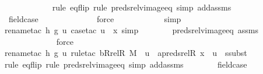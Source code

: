 \begin{isabellebody}
\ \ \ \ \ \ \ \ \ \ \ \isamarkupfalse%
{\isacharparenleft}{\kern0pt}rule\ eq{\isacharunderscore}{\kern0pt}flip{\isacharcomma}{\kern0pt}\ rule\ preds{\isacharunderscore}{\kern0pt}rel{\isacharunderscore}{\kern0pt}vimage{\isacharunderscore}{\kern0pt}eq{\isacharcomma}{\kern0pt}\ simp\ add{\isacharcolon}{\kern0pt}assms{\isacharparenright}{\kern0pt}\isanewline
\ \ \ \ \ \ \isamarkupfalse%
\ fieldcase\ \isanewline
\ \ \ \ \ \ \ \ \ \ \ \isamarkupfalse%
\ force\isanewline
\ \ \ \ \ \ \ \ \ \ \isamarkupfalse%
\ simp\isanewline
\ \ \ \ \ \ \ \ \ \ \isamarkupfalse%
{\isacharparenleft}{\kern0pt}rename{\isacharunderscore}{\kern0pt}tac\ h\ g\ u{\isacharcomma}{\kern0pt}\ case{\isacharunderscore}{\kern0pt}tac\ {\isachardoublequoteopen}u\ {\isacharequal}{\kern0pt}\ x{\isachardoublequoteclose}{\isacharcomma}{\kern0pt}\ simp{\isacharparenright}{\kern0pt}\isanewline
\ \ \ \ \ \ \isamarkupfalse%
\ preds{\isacharunderscore}{\kern0pt}rel{\isacharunderscore}{\kern0pt}vimage{\isacharunderscore}{\kern0pt}eq{\isacharprime}{\kern0pt}\ assms\ \isanewline
\ \ \ \ \ \ \ \ \ \ \ \isamarkupfalse%
\ force\isanewline
\ \ \ \ \ \ \ \ \ \isamarkupfalse%
{\isacharparenleft}{\kern0pt}rename{\isacharunderscore}{\kern0pt}tac\ h\ g\ u{\isacharcomma}{\kern0pt}\ rule{\isacharunderscore}{\kern0pt}tac\ b{\isacharequal}{\kern0pt}{\isachardoublequoteopen}Rrel{\isacharparenleft}{\kern0pt}R{\isacharcomma}{\kern0pt}\ M{\isacharparenright}{\kern0pt}\ {\isacharminus}{\kern0pt}{\isacharbackquote}{\kern0pt}{\isacharbackquote}{\kern0pt}\ {\isacharbraceleft}{\kern0pt}u{\isacharbraceright}{\kern0pt}{\isachardoublequoteclose}\ \ a{\isacharequal}{\kern0pt}{\isachardoublequoteopen}preds{\isacharunderscore}{\kern0pt}rel{\isacharparenleft}{\kern0pt}R{\isacharcomma}{\kern0pt}\ x{\isacharparenright}{\kern0pt}\ {\isacharminus}{\kern0pt}{\isacharbackquote}{\kern0pt}{\isacharbackquote}{\kern0pt}\ {\isacharbraceleft}{\kern0pt}u{\isacharbraceright}{\kern0pt}{\isachardoublequoteclose}\ \ ssubst{\isacharparenright}{\kern0pt}\isanewline
\ \ \ \ \ \ \ \ \ \ \ \isamarkupfalse%
{\isacharparenleft}{\kern0pt}rule\ eq{\isacharunderscore}{\kern0pt}flip{\isacharcomma}{\kern0pt}\ rule\ preds{\isacharunderscore}{\kern0pt}rel{\isacharunderscore}{\kern0pt}vimage{\isacharunderscore}{\kern0pt}eq{\isacharcomma}{\kern0pt}\ simp\ add{\isacharcolon}{\kern0pt}assms{\isacharparenright}{\kern0pt}\isanewline
\ \ \ \ \ \ \isamarkupfalse%
\ fieldcase\ \isanewline

\end{isabellebody}
